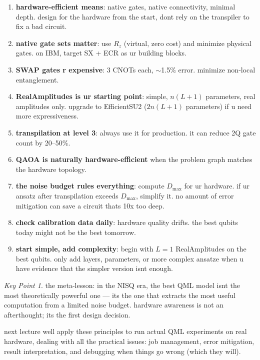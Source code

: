 \documentclass[11pt,a4paper]{article}
\theoremstyle{definition}
\theoremstyle{remark}
\newtheorem*{keypoint}{Key Point}
\begin{document}
\begin{enumerate}[label=\arabic*.]
    \item \textbf{hardware-efficient means}: native gates, native connectivity, minimal depth. design for the hardware from the start, dont rely on the transpiler to fix a bad circuit.

    \item \textbf{native gate sets matter}: use $R_z$ (virtual, zero cost) and minimize physical gates. on IBM, target SX + ECR as ur building blocks.

    \item \textbf{SWAP gates r expensive}: 3 CNOTs each, $\sim$1.5\% error. minimize non-local entanglement.

    \item \textbf{RealAmplitudes is ur starting point}: simple, $n(L+1)$ parameters, real amplitudes only. upgrade to EfficientSU2 ($2n(L+1)$ parameters) if u need more expressiveness.

    \item \textbf{transpilation at level 3}: always use it for production. it can reduce 2Q gate count by 20--50\%.

    \item \textbf{QAOA is naturally hardware-efficient} when the problem graph matches the hardware topology.

    \item \textbf{the noise budget rules everything}: compute $D_{\max}$ for ur hardware. if ur ansatz after transpilation exceeds $D_{\max}$, simplify it. no amount of error mitigation can save a circuit thats 10x too deep.

    \item \textbf{check calibration data daily}: hardware quality drifts. the best qubits today might not be the best tomorrow.

    \item \textbf{start simple, add complexity}: begin with $L=1$ RealAmplitudes on the best qubits. only add layers, parameters, or more complex ansatze when u have evidence that the simpler version isnt enough.
\end{enumerate}

\begin{keypoint}
the meta-lesson: in the NISQ era, the best QML model isnt the most theoretically powerful one --- its the one that extracts the most useful computation from a limited noise budget. hardware awareness is not an afterthought; its the first design decision.
\end{keypoint}

next lecture well apply these principles to run actual QML experiments on real hardware, dealing with all the practical issues: job management, error mitigation, result interpretation, and debugging when things go wrong (which they will).
\end{document}
